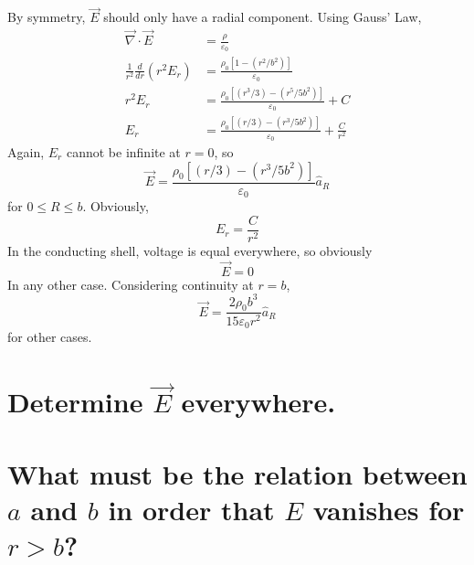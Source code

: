 \documentclass[answers]{exam}
\begin{document}
\begin{questions}

\begin{solution}
	By symmetry, $\vec{E}$ should only have a radial component. Using Gauss' Law,
	\begin{align*}
		\vec{\nabla}\cdot\vec{E} &= \frac{\rho}{\varepsilon_0} \\
		\frac{1}{r^2}\frac{d}{dr}\left(r^2E_r\right) &= \frac{\rho_0[1-(r^2/b^2)]}{\varepsilon_0} \\
		r^2E_r &= \frac{\rho_0[(r^3/3)-(r^5/5b^2)]}{\varepsilon_0} + C \\
		E_r &= \frac{\rho_0[(r/3)-(r^3/5b^2)]}{\varepsilon_0} + \frac{C}{r^2}
	\end{align*}
	Again, $E_r$ cannot be infinite at $r=0$, so
	$$\vec{E} = \frac{\rho_0[(r/3)-(r^3/5b^2)]}{\varepsilon_0}\hat{a}_R$$
	for $0\leq R\leq b$. Obviously,
	$$E_r = \frac{C}{r^2}$$
	In the conducting shell, voltage is equal everywhere, so obviously
	$$\vec{E} = 0$$
	In any other case. Considering continuity at $r=b$,
	$$\vec{E} = \frac{2\rho_0b^3}{15\varepsilon_0r^2}\hat{a}_R$$
	for other cases.
\end{solution}


\begin{parts}
	\part{Determine $\vec{E}$ everywhere.}
	\part{What must be the relation between $a$ and $b$ in order that $E$ vanishes for $r>b$?}
\end{parts}


\end{questions}
\end{document}
